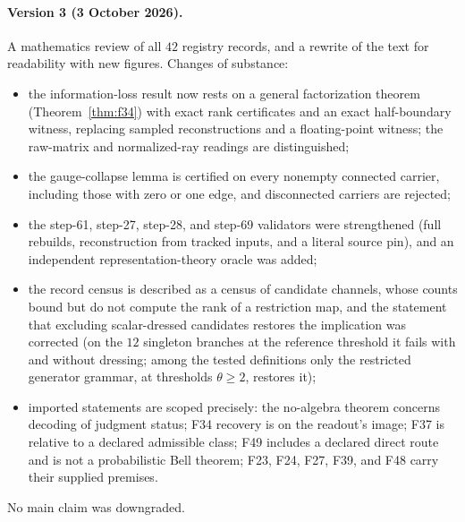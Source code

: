\paragraph{Version 3 (3 October 2026).} A mathematics review of all \(42\) registry records, and a rewrite of the text
for readability with new figures. Changes of substance:
\begin{itemize}\tightlist
\item the information-loss result now rests on a general factorization theorem (Theorem~\ref{thm:f34}) with exact
  rank certificates and an exact half-boundary witness, replacing sampled reconstructions and a floating-point witness;
  the raw-matrix and normalized-ray readings are distinguished;
\item the gauge-collapse lemma is certified on every nonempty connected carrier, including those with zero or one
  edge, and disconnected carriers are rejected;
\item the step-61, step-27, step-28, and step-69 validators were strengthened (full rebuilds, reconstruction from
  tracked inputs, and a literal source pin), and an independent representation-theory oracle was added;
\item the record census is described as a census of candidate channels, whose counts bound but do not compute the
  rank of a restriction map, and the statement that excluding scalar-dressed candidates restores the implication was
  corrected (on the \(12\) singleton branches at the reference threshold it fails with and without dressing; among
the tested definitions only the restricted generator grammar, at thresholds \(\theta\ge2\), restores it);
\item imported statements are scoped precisely: the no-algebra theorem concerns decoding of judgment status; F34
  recovery is on the readout's image; F37 is relative to a declared admissible class; F49 includes a declared direct
  route and is not a probabilistic Bell theorem; F23, F24, F27, F39, and F48 carry their supplied premises.
\end{itemize}
No main claim was downgraded.
